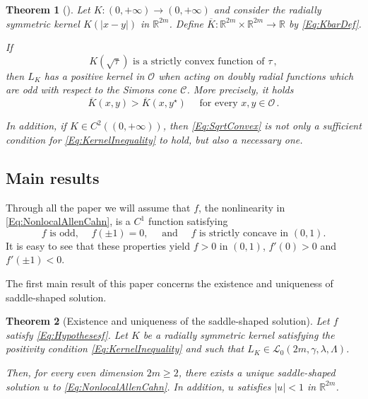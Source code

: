 \documentclass[12pt,reqno]{amsart}
\newtheorem{theorem}{Theorem}[section]
\theoremstyle{definition}
\theoremstyle{remark}
\newcommand{\con}[1]{\mathbb{#1}}
\newcommand{\R}{\con{R}} %
\newcommand{\ccal}{\mathscr{C}}
\newcommand{\lcal}{\mathcal{L}}
\newcommand{\ocal}{\mathcal{O}}
\newcommand{\s}{\gamma}
\numberwithin{equation}{section}
\begin{document}
\begin{theorem}[\cite{FelipeSanz-Perela:IntegroDifferentialI}]
	\label{Th:SufficientNecessaryConditions}
	Let $K:(0,+\infty) \to (0,+\infty)$ and consider the radially symmetric kernel $K(|x-y|)$ in $\R^{2m}$. Define $\overline{K} : \R^{2m}\times \R^{2m} \to \R$ by \eqref{Eq:KbarDef}.
	
	If 
	\begin{equation}
	\label{Eq:SqrtConvex}	
	K(\sqrt{\tau}) \text{ is a strictly convex function of }\tau\,,
	\end{equation}
	then $L_K$ has a positive kernel in $\ocal$ when acting on doubly radial functions which are odd with respect to the Simons cone $\ccal$. More precisely, it holds
	\begin{equation}
	\label{Eq:KernelInequality}
	\overline{K}(x,y) > \overline{K}(x, y^\star) \quad \text{ for every }x,y \in \ocal\,.
	\end{equation}
	
	In addition, if $K\in C^2((0,+\infty))$, then \eqref{Eq:SqrtConvex} is not only a sufficient condition for \eqref{Eq:KernelInequality} to hold, but also a necessary one.
\end{theorem}

\subsection{Main results}
\label{Subsec:Main results}

Through all the paper we will assume that $f$, the nonlinearity in \eqref{Eq:NonlocalAllenCahn}, is a $C^1$ function satisfying
\begin{equation}
\label{Eq:Hypothesesf}
f \textrm{ is odd, } \quad f(\pm 1)=0, \quad \text{ and } \quad f \textrm{ is strictly concave in }  (0,1).
\end{equation}
It is easy to see that these properties yield $f>0$ in $(0,1)$, $f'(0)>0$ and $f'(\pm 1) < 0$. 

The first main result of this paper concerns the existence and uniqueness of saddle-shaped solution.


\begin{theorem}[Existence and uniqueness of the saddle-shaped solution]
	\label{Th:ExistenceUniqueness}
	Let $f$ satisfy \eqref{Eq:Hypothesesf}. Let $K$ be a radially symmetric kernel satisfying the positivity condition \eqref{Eq:KernelInequality} and such that $L_K\in \lcal_0(2m, \s, \lambda, \Lambda)$. 
	
	Then, for every even dimension $2m \geq 2$, there exists a unique saddle-shaped solution $u$ to \eqref{Eq:NonlocalAllenCahn}. In addition, $u$ satisfies $|u|<1$ in $\R^{2m}$.
\end{theorem}
\end{document}

